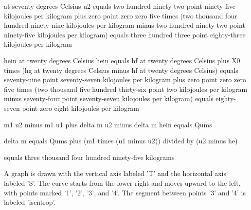 at seventy degrees Celsius  
u2 equals two hundred ninety-two point ninety-five kilojoules per kilogram plus zero point zero zero five times (two thousand four hundred ninety-nine kilojoules per kilogram minus two hundred ninety-two point ninety-five kilojoules per kilogram)  
equals three hundred three point eighty-three kilojoules per kilogram  

hein at twenty degrees Celsius  
hein equals hf at twenty degrees Celsius plus X0 times (hg at twenty degrees Celsius minus hf at twenty degrees Celsius)  
equals seventy-nine point seventy-seven kilojoules per kilogram plus zero point zero zero five times (two thousand five hundred thirty-six point two kilojoules per kilogram minus seventy-four point seventy-seven kilojoules per kilogram)  
equals eighty-seven point zero eight kilojoules per kilogram  

m1 u2 minus m1 u1 plus delta m u2 minus delta m hein equals Qums  

delta m equals Qums plus (m1 times (u1 minus u2)) divided by (u2 minus he)  

equals three thousand four hundred ninety-five kilograms

A graph is drawn with the vertical axis labeled 'T' and the horizontal axis labeled 'S'. The curve starts from the lower right and moves upward to the left, with points marked '1', '2', '3', and '4'. The segment between points '3' and '4' is labeled 'isentrop'.
